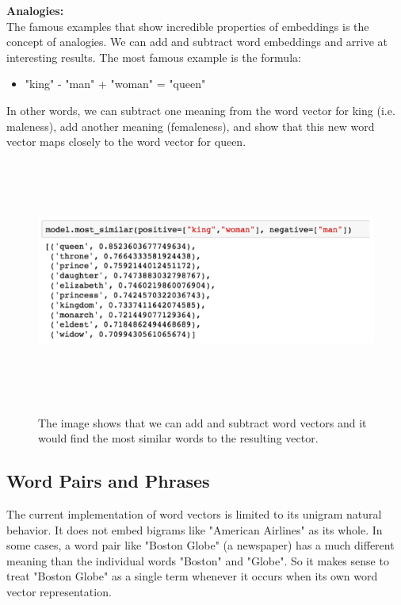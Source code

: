 \noindent \textbf{Analogies:}\\

The famous examples that show incredible properties of embeddings is the concept of analogies. We can add and subtract word embeddings and arrive at interesting results. The most famous example is the formula:
\begin{itemize}
\item{"king" - "man" + "woman" = "queen"}
\end{itemize}
In other words, we can subtract one meaning from the word vector for king (i.e. maleness), add another meaning (femaleness), and show that this new word vector maps closely to the word vector for queen.

\begin{figure}[htbp]
\centering
\includegraphics[width=16cm, height=8cm]{images/king-man+woman-gensim.png}\\
\centering
\caption{The image shows that we can add and subtract word vectors and it would find the most similar words to the resulting vector.}
\label{fig:foo}
\end{figure}

\newpage
\subsection{Word Pairs and Phrases}

The current implementation of word vectors is limited to its unigram natural behavior. It does not embed bigrams like "American Airlines" as its whole. In some cases, a word pair like "Boston Globe" (a newspaper) has a much different meaning than the individual words "Boston" and "Globe". So it makes sense to treat "Boston Globe" as a single term whenever it occurs when its own word vector representation.

